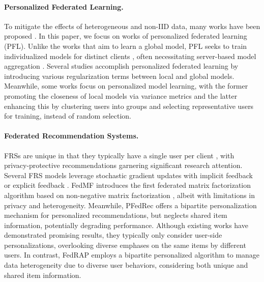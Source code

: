 \documentclass{article} %
\begin{document}
\paragraph{Personalized Federated Learning.}
To mitigate the effects of heterogeneous and non-IID data, many works have been proposed \citep{yang2018applied,zhao2018federated,ji2019learning,karimireddy2020scaffold,huang2020personalized,luo2021no,li2021ditto,wu2021fast,hao2021towards,luo2023perfedrec++}.
In this paper, we focus on works of personalized federated learning (PFL). Unlike the works that aim to learn a global model, PFL seeks to train individualized models for distinct clients \citep{tan2022towards}, often necessitating server-based model aggregation \citep{arivazhagan2019federated,t2020personalized,collins2021exploiting}. 
Several studies \citep{ammad2019federated,huang2020personalized,t2020personalized} accomplish personalized federated learning by introducing various regularization terms between local and global models.
Meanwhile, some works \citep{flanagan2020federated, li2021ditto, luo2022personalized} focus on personalized model learning, with the former promoting the closeness of local models via variance metrics and the latter enhancing this by clustering users into groups and selecting representative users for training, instead of random selection.


\paragraph{Federated Recommendation Systems.}
FRSs are unique in that they typically have a single user per client \citep{sun2022survey}, with privacy-protective recommendations garnering significant research attention. 
Several FRS models leverage stochastic gradient updates with implicit feedback \citep{ammad2019federated} or explicit feedback \citep{lin2020fedrec,liang2021fedrec++,perifanis2022federated,luo2022personalized}.
FedMF \citep{chai2020secure} introduces the first federated matrix factorization algorithm based on non-negative matrix factorization \citep{lee2000algorithms}, albeit with limitations in privacy and heterogeneity.
Meanwhile, PFedRec \citep{zhangdual} offers a bipartite personalization mechanism for personalized recommendations, but neglects shared item information, potentially degrading performance. Although existing works have demonstrated promising results, they typically only consider user-side personalizations, overlooking diverse emphases on the same items by different users. 
In contrast, FedRAP employs a bipartite personalized algorithm to manage data heterogeneity due to diverse user behaviors, considering both unique and shared item information.
\end{document}

